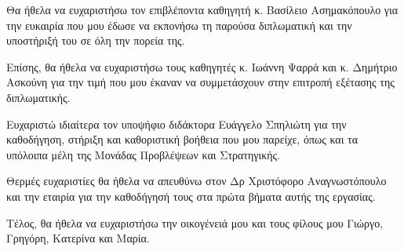 \begin{acknowledgements}

Θα ήθελα να ευχαριστήσω τον επιβλέποντα καθηγητή κ. Βασίλειο Ασημακόπουλο για την ευκαιρία που μου έδωσε να εκπονήσω τη παρούσα διπλωματική και την υποστήριξή του σε όλη την πορεία της.

Επίσης, θα ήθελα να ευχαριστήσω  τους καθηγητές κ. Ιωάννη Ψαρρά και κ. Δημήτριο Ασκούνη για την τιμή που μου έκαναν να συμμετάσχουν στην επιτροπή εξέτασης της διπλωματικής.

Eυχαριστώ ιδιαίτερα τον υποψήφιο διδάκτορα Ευάγγελο Σπηλιώτη για την καθοδήγηση, στήριξη και καθοριστική βοήθεια που μου παρείχε, όπως και τα υπόλοιπα μέλη της Μονάδας Προβλέψεων και Στρατηγικής.

Θερμές ευχαριστίες θα ήθελα να απευθύνω στον Δρ Χριστόφορο Αναγνωστόπουλο και την εταιρία  για την καθοδήγησή τους στα πρώτα βήματα αυτής της εργασίας.

Τέλος, θα ήθελα να ευχαριστήσω την οικογένειά μου και τους φίλους μου Γιώργο, Γρηγόρη, Κατερίνα και Μαρία.

\end{acknowledgements}


